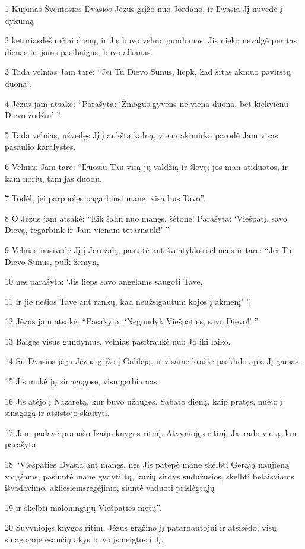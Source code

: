 \par 1 Kupinas Šventosios Dvasios Jėzus grįžo nuo Jordano, ir Dvasia Jį nuvedė į dykumą 
\par 2 keturiasdešimčiai dienų, ir Jis buvo velnio gundomas. Jis nieko nevalgė per tas dienas ir, joms pasibaigus, buvo alkanas. 
\par 3 Tada velnias Jam tarė: “Jei Tu Dievo Sūnus, liepk, kad šitas akmuo pavirstų duona”. 
\par 4 Jėzus jam atsakė: “Parašyta: ‘Žmogus gyvens ne viena duona, bet kiekvienu Dievo žodžiu’ ”. 
\par 5 Tada velnias, užvedęs Jį į aukštą kalną, viena akimirka parodė Jam visas pasaulio karalystes. 
\par 6 Velnias Jam tarė: “Duosiu Tau visą jų valdžią ir šlovę; jos man atiduotos, ir kam noriu, tam jas duodu. 
\par 7 Todėl, jei parpuolęs pagarbinsi mane, visa bus Tavo”. 
\par 8 O Jėzus jam atsakė: “Eik šalin nuo manęs, šėtone! Parašyta: ‘Viešpatį, savo Dievą, tegarbink ir Jam vienam tetarnauk!’ ” 
\par 9 Velnias nusivedė Jį į Jeruzalę, pastatė ant šventyklos šelmens ir tarė: “Jei Tu Dievo Sūnus, pulk žemyn, 
\par 10 nes parašyta: ‘Jis lieps savo angelams saugoti Tave, 
\par 11 ir jie nešios Tave ant rankų, kad neužsigautum kojos į akmenį’ ”. 
\par 12 Jėzus jam atsakė: “Pasakyta: ‘Negundyk Viešpaties, savo Dievo!’ ” 
\par 13 Baigęs visus gundymus, velnias pasitraukė nuo Jo iki laiko. 
\par 14 Su Dvasios jėga Jėzus grįžo į Galilėją, ir visame krašte pasklido apie Jį garsas. 
\par 15 Jis mokė jų sinagogose, visų gerbiamas. 
\par 16 Jis atėjo į Nazaretą, kur buvo užaugęs. Sabato dieną, kaip pratęs, nuėjo į sinagogą ir atsistojo skaityti. 
\par 17 Jam padavė pranašo Izaijo knygos ritinį. Atvyniojęs ritinį, Jis rado vietą, kur parašyta: 
\par 18 “Viešpaties Dvasia ant manęs, nes Jis patepė mane skelbti Gerąją naujieną vargšams, pasiuntė mane gydyti tų, kurių širdys sudužusios, skelbti belaisviams išvadavimo, akliesiems­regėjimo, siuntė vaduoti prislėgtųjų 
\par 19 ir skelbti maloningųjų Viešpaties metų”. 
\par 20 Suvyniojęs knygos ritinį, Jėzus grąžino jį patarnautojui ir atsisėdo; visų sinagogoje esančių akys buvo įsmeigtos į Jį. 
